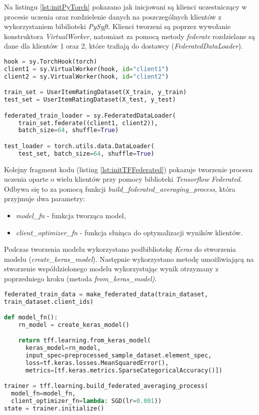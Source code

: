 Na listingu \ref{lst:initPyTorch} pokazano jak inicjowani są klienci uczestniczący w procesie uczenia oraz rozdzielenie danych na poszczególnych klientów z wykorzystaniem bibilioteki \textit{PySyft}. Klienci tworzeni są poprzez wywołanie konstruktora \textit{VirtualWorker}, natomiast za pomocą metody \textit{federate} rozdzielane są dane dla klientów 1 oraz 2, które trafiają do dostawcy (\textit{FederatedDataLoader}).

\begin{lstlisting}[language=Python, caption={Inicjalizacja klientów oraz podział danych}, label={lst:initPyTorch}, captionpos=b]
hook = sy.TorchHook(torch)
client1 = sy.VirtualWorker(hook, id="client1")
client2 = sy.VirtualWorker(hook, id="client2")

train_set = UserItemRatingDataset(X_train, y_train)
test_set = UserItemRatingDataset(X_test, y_test)

federated_train_loader = sy.FederatedDataLoader(
    train_set.federate((client1, client2)), 
    batch_size=64, shuffle=True)

test_loader = torch.utils.data.DataLoader(
    test_set, batch_size=64, shuffle=True)
\end{lstlisting}

Kolejny fragment kodu (listing \ref{lst:initTFFederated}) pokazuje tworzenie procesu uczenia oparte o wielu klientów przy pomocy biblioteki \textit{Tensorflow Federated}. Odbywa się to za pomocą funkcji \textit{build\_federated\_averaging\_process}, która przyjmuje dwa parametry:
\begin{itemize}
    \item \textit{model\_fn} - funkcja tworząca model,
    \item \textit{client\_optimizer\_fn} - funkcja służąca do optymalizacji wyników klientów.
\end{itemize}

Podczas tworzenia modelu wykorzystano podbibliotekę \textit{Keras} do stworzenia modelu (\textit{create\_keras\_model}). Następnie wykorzystano metodę umożliwiającą na stworzenie współdzielonego modelu wykorzystując wynik otrzymany z poprzedniego kroku (metoda \textit{from\_keras\_model)}.

\begin{lstlisting}[language=Python, caption={Tworzenie "trenera" - Tensorflow Federated}, label={lst:initTFFederated}, captionpos=b]
federated_train_data = make_federated_data(train_dataset, 
train_dataset.client_ids)

def model_fn():
    rn_model = create_keras_model()

    return tff.learning.from_keras_model(
      keras_model=rn_model,
      input_spec=preprocessed_sample_dataset.element_spec,
      loss=tf.keras.losses.MeanSquaredError(),
      metrics=[tf.keras.metrics.SparseCategoricalAccuracy()])

trainer = tff.learning.build_federated_averaging_process(
  model_fn=model_fn,
  client_optimizer_fn=lambda: SGD(lr=0.001))
state = trainer.initialize()
\end{lstlisting}


